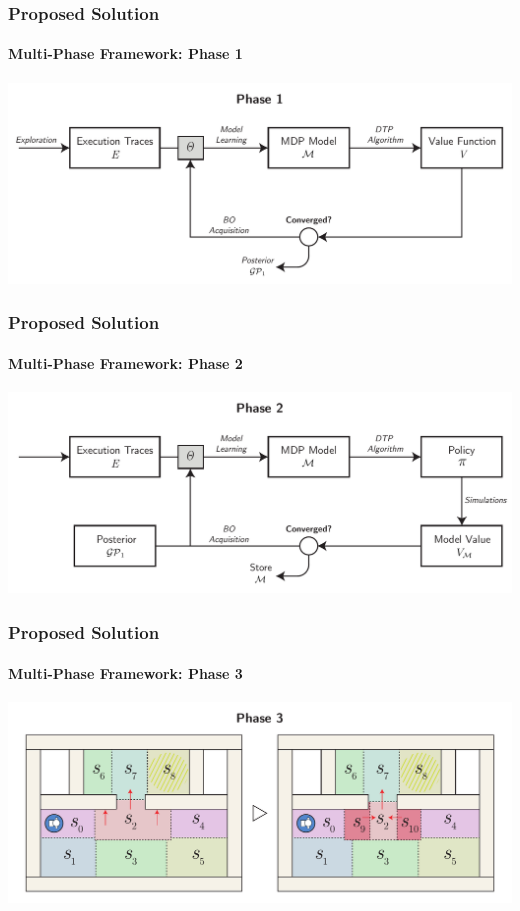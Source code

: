 \begin{frame}
\frametitle{Proposed Solution}
\framesubtitle{Multi-Phase Framework: Phase 1}

\begin{center}
	\includegraphics[width=\textwidth]{figures/phase-1v2}
\end{center}

\end{frame}

\begin{frame}
	\frametitle{Proposed Solution}
	\framesubtitle{Multi-Phase Framework: Phase 2}
	
	\begin{center}
		\includegraphics[width=\textwidth]{figures/phase-2v3}
	\end{center}
	
\end{frame}

\begin{frame}
	\frametitle{Proposed Solution}
	\framesubtitle{Multi-Phase Framework: Phase 3}
	
	\begin{center}
		\includegraphics[width=\textwidth]{figures/phase-3}
	\end{center}
	
\end{frame}